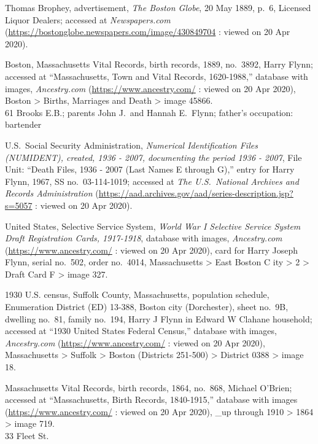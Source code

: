 \begin{thebibliography}{99}
	Thomas Brophey, advertisement, \textit{The Boston Globe}, 20 May 1889, p.\ 6, Licensed Liquor Dealers; accessed at \textit{Newspapers.com} (\url{https://bostonglobe.newspapers.com/image/430849704} : viewed on 20 Apr 2020).
	
	Boston, Massachusetts Vital Records, birth records, 1889, no.\ 3892, Harry Flynn; accessed at ``Massachusetts, Town and Vital Records, 1620-1988,'' database with images, \textit{Ancestry.com} (\url{https://www.ancestry.com/} : viewed on 20 Apr 2020), Boston > Births, Marriages and Death > image 45866.\\
	61 Brooks E.B.; parents John J.\ and Hannah E.\ Flynn; father's occupation: bartender
	
	U.S.\ Social Security Administration, \textit{Numerical Identification Files (NUMIDENT), created, 1936 - 2007, documenting the period 1936 - 2007}, File Unit: ``Death Files, 1936 - 2007 (Last Names E through G),'' entry for Harry Flynn, 1967,  SS no.\ 03-114-1019; accessed at \textit{The U.S.\ National Archives and Records Administration} (\url{https://aad.archives.gov/aad/series-description.jsp?s=5057} : viewed on 20 Apr 2020).
	
	United States, Selective Service System, \textit{World War I Selective Service System Draft Registration Cards, 1917-1918}, database with images, \textit{Ancestry.com} (\url{https://www.ancestry.com/} : viewed on 20 Apr 2020), card for Harry Joseph Flynn, serial no.\ 502, order no.\ 4014, Massachusetts > East Boston C ity > 2 > Draft Card F > image 327.
	
	1930 U.S. census, Suffolk County, Massachusetts, population schedule, Enumeration District (ED) 13-388, Boston city (Dorchester), sheet no.\ 9B, dwelling no.\ 81, family no.\ 194, Harry J Flynn in Edward W Clahane household; accessed at ``1930 United States Federal Census,'' database with images, \textit{Ancestry.com} (\url{https://www.ancestry.com/} : viewed on 20 Apr 2020), Massachusetts > Suffolk > Boston (Districts 251-500) > District 0388 > image 18.
	
	Massachusetts Vital Records, birth records, 1864, no.\ 868, Michael O'Brien; accessed at ``Massachusetts, Birth Records, 1840-1915,'' database with images (\url{https://www.ancestry.com/} : viewed on 20 Apr 2020), \_up through 1910 > 1864 > image 719.\\
	33 Fleet St.
	

\end{thebibliography}
